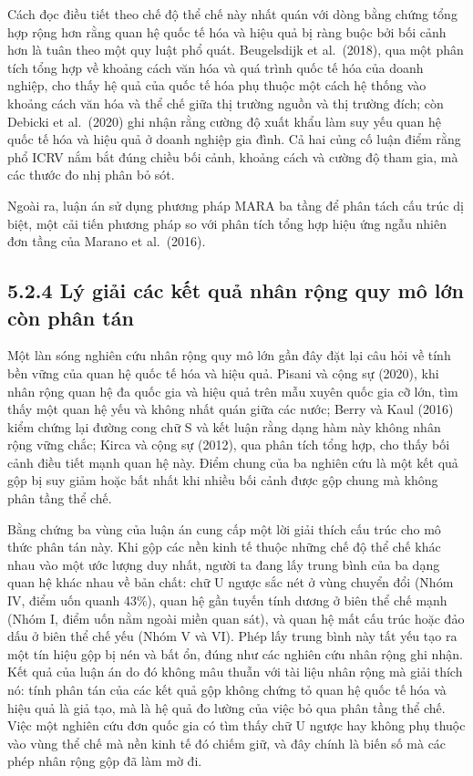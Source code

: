 \documentclass[
  a4paper,
  13pt]{extreport}
\begin{document}
Cách đọc điều tiết theo chế độ thể chế này nhất quán với dòng bằng chứng
tổng hợp rộng hơn rằng quan hệ quốc tế hóa và hiệu quả bị ràng buộc bởi
bối cảnh hơn là tuân theo một quy luật phổ quát. Beugelsdijk et
al.~(2018), qua một phân tích tổng hợp về khoảng cách văn hóa và quá
trình quốc tế hóa của doanh nghiệp, cho thấy hệ quả của quốc tế hóa phụ
thuộc một cách hệ thống vào khoảng cách văn hóa và thể chế giữa thị
trường nguồn và thị trường đích; còn Debicki et al.~(2020) ghi nhận rằng
cường độ xuất khẩu làm suy yếu quan hệ quốc tế hóa và hiệu quả ở doanh
nghiệp gia đình. Cả hai củng cố luận điểm rằng phổ ICRV nắm bắt đúng
chiều bối cảnh, khoảng cách và cường độ tham gia, mà các thước đo nhị
phân bỏ sót.

Ngoài ra, luận án sử dụng phương pháp MARA ba tầng để phân tách cấu trúc
dị biệt, một cải tiến phương pháp so với phân tích tổng hợp hiệu ứng
ngẫu nhiên đơn tầng của Marano et al.~(2016).

\hypertarget{luxfd-giux1ea3i-cuxe1c-kux1ebft-quux1ea3-nhuxe2n-rux1ed9ng-quy-muxf4-lux1edbn-cuxf2n-phuxe2n-tuxe1n}{%
\subsection{5.2.4 Lý giải các kết quả nhân rộng quy mô lớn còn phân
tán}\label{luxfd-giux1ea3i-cuxe1c-kux1ebft-quux1ea3-nhuxe2n-rux1ed9ng-quy-muxf4-lux1edbn-cuxf2n-phuxe2n-tuxe1n}}

Một làn sóng nghiên cứu nhân rộng quy mô lớn gần đây đặt lại câu hỏi về
tính bền vững của quan hệ quốc tế hóa và hiệu quả. Pisani và cộng sự
(2020), khi nhân rộng quan hệ đa quốc gia và hiệu quả trên mẫu xuyên
quốc gia cỡ lớn, tìm thấy một quan hệ yếu và không nhất quán giữa các
nước; Berry và Kaul (2016) kiểm chứng lại đường cong chữ S và kết luận
rằng dạng hàm này không nhân rộng vững chắc; Kirca và cộng sự (2012),
qua phân tích tổng hợp, cho thấy bối cảnh điều tiết mạnh quan hệ này.
Điểm chung của ba nghiên cứu là một kết quả gộp bị suy giảm hoặc bất
nhất khi nhiều bối cảnh được gộp chung mà không phân tầng thể chế.

Bằng chứng ba vùng của luận án cung cấp một lời giải thích cấu trúc cho
mô thức phân tán này. Khi gộp các nền kinh tế thuộc những chế độ thể chế
khác nhau vào một ước lượng duy nhất, người ta đang lấy trung bình của
ba dạng quan hệ khác nhau về bản chất: chữ U ngược sắc nét ở vùng chuyển
đổi (Nhóm IV, điểm uốn quanh 43\%), quan hệ gần tuyến tính dương ở biên
thể chế mạnh (Nhóm I, điểm uốn nằm ngoài miền quan sát), và quan hệ mất
cấu trúc hoặc đảo dấu ở biên thể chế yếu (Nhóm V và VI). Phép lấy trung
bình này tất yếu tạo ra một tín hiệu gộp bị nén và bất ổn, đúng như các
nghiên cứu nhân rộng ghi nhận. Kết quả của luận án do đó không mâu thuẫn
với tài liệu nhân rộng mà giải thích nó: tính phân tán của các kết quả
gộp không chứng tỏ quan hệ quốc tế hóa và hiệu quả là giả tạo, mà là hệ
quả đo lường của việc bỏ qua phân tầng thể chế. Việc một nghiên cứu đơn
quốc gia có tìm thấy chữ U ngược hay không phụ thuộc vào vùng thể chế mà
nền kinh tế đó chiếm giữ, và đây chính là biến số mà các phép nhân rộng
gộp đã làm mờ đi.
\end{document}
